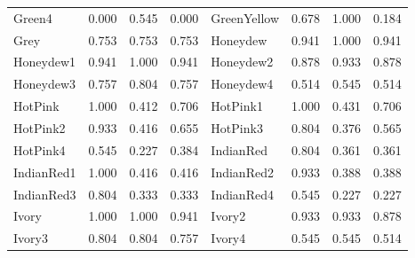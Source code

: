 {\begin{center}
\begin{tabular}{|l|l|l|l|l|l|l|l|}
Green4              & 0.000 & 0.545 & 0.000 & GreenYellow         & 0.678 & 1.000 & 0.184 \\ 
Grey                & 0.753 & 0.753 & 0.753 & Honeydew            & 0.941 & 1.000 & 0.941 \\ 
Honeydew1           & 0.941 & 1.000 & 0.941 & Honeydew2           & 0.878 & 0.933 & 0.878 \\ 
Honeydew3           & 0.757 & 0.804 & 0.757 & Honeydew4           & 0.514 & 0.545 & 0.514 \\ 
HotPink             & 1.000 & 0.412 & 0.706 & HotPink1            & 1.000 & 0.431 & 0.706 \\ 
HotPink2            & 0.933 & 0.416 & 0.655 & HotPink3            & 0.804 & 0.376 & 0.565 \\ 
HotPink4            & 0.545 & 0.227 & 0.384 & IndianRed           & 0.804 & 0.361 & 0.361 \\ 
IndianRed1          & 1.000 & 0.416 & 0.416 & IndianRed2          & 0.933 & 0.388 & 0.388 \\ 
IndianRed3          & 0.804 & 0.333 & 0.333 & IndianRed4          & 0.545 & 0.227 & 0.227 \\ 
Ivory               & 1.000 & 1.000 & 0.941 & Ivory2              & 0.933 & 0.933 & 0.878 \\ 
Ivory3              & 0.804 & 0.804 & 0.757 & Ivory4              & 0.545 & 0.545 & 0.514 \\ 
\hline
\end{tabular}
\end{center}

}
